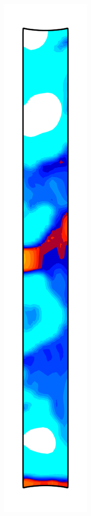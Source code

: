 \begin{figure}[!htb]
\begin{subfigure}{0.08\textwidth}
  \end{subfigure}
  \begin{subfigure}{0.08\textwidth}
    \centering
    \includegraphics[width=\textwidth]{Chapter5/figures/spallation/c_5}

\end{subfigure}
\end{figure}
